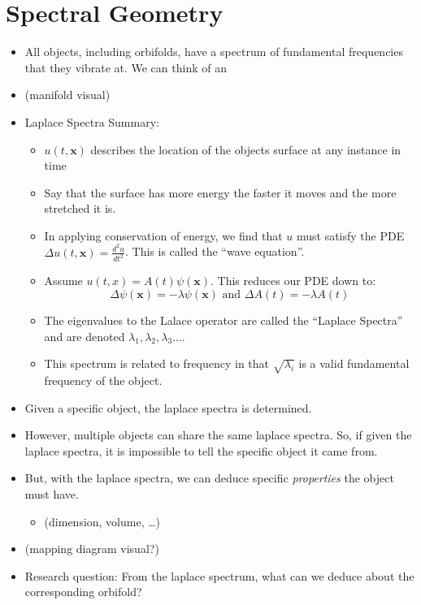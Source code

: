 \documentclass{article}
\begin{document}
\section{Spectral Geometry}
\begin{itemize}
    \item All objects, including orbifolds, have a spectrum of fundamental frequencies that they vibrate at. We can think of an 
   \item (manifold visual)
   \item Laplace Spectra Summary:
   \begin{itemize}
        \item $u(t,\mathbf{x})$ describes the location of the objects surface at any instance in time
        \item Say that the surface has more energy the faster it moves and the more stretched it is.
        \item In applying conservation of energy, we find that $u$ must satisfy the PDE $\Delta u(t,\mathbf{x}) = \frac{d^2u}{dt^2}$. This is called the ``wave equation''.
        \item Assume $u(t,x) = A(t)\psi(\mathbf{x})$. This reduces our PDE down to:
        $$\Delta \psi(\mathbf{x}) = -\lambda \psi(\mathbf{x}) \text{ and } \Delta A(t) = -\lambda A(t)$$
    \item The eigenvalues to the Lalace operator are called the ``Laplace Spectra'' and are denoted $\lambda_1, \lambda_2, \lambda_3 \dots$.
    \item This spectrum is related to frequency in that $\sqrt{\lambda_i}$ is a valid fundamental frequency of the object.
   \end{itemize}
    \item Given a specific object, the laplace spectra is determined.
    \item However, multiple objects can share the same laplace spectra. So, if given the laplace spectra, it is impossible to tell the specific object it came from.
    \item But, with the laplace spectra, we can deduce specific \emph{properties} the object must have. 
   \begin{itemize}
        \item (dimension, volume, \dots)
   \end{itemize}
    \item (mapping diagram visual?)
    \item Research question: From the laplace spectrum, what can we deduce about the corresponding orbifold?
\end{itemize}
\end{document}

